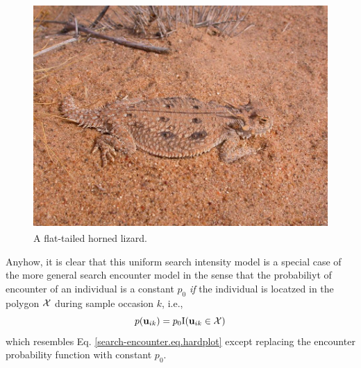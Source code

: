 \begin{figure}
\centering
\includegraphics[width=4.5in,height=3.38in]{Ch15-searchencounter/figs/horny_lizard.jpg}
\caption{A flat-tailed horned lizard.
}
\label{searchencounter.fig.hornylizard}
\end{figure}


Anyhow, it is clear that this uniform search intensity model is a
special case of the more general search encounter model in the sense
that the probabiliyt of encounter of an individual is a constant
$p_{0}$ {\it if} the individual is locatzed in the polygon ${\cal X}$
during sample occasion $k$,  i.e., 
\[
p({\bf u}_{ik}) = p_{0} \mbox{I}({\bf u}_{ik} \in {\cal X})
\]
which resembles Eq. \ref{search-encounter.eq.hardplot}
except replacing the encounter
probability function with constant $p_{0}$. 

